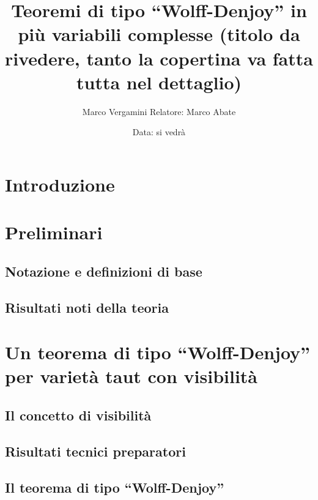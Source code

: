 \documentclass{article}
\title{Teoremi di tipo ``Wolff-Denjoy'' in più variabili complesse (titolo da rivedere, tanto la copertina va fatta tutta nel dettaglio)}
\author{Marco Vergamini Relatore: Marco Abate}
\date{Data: si vedrà}
\begin{document}
\maketitle
\newpage
\tableofcontents
\newpage


\section*{Introduzione}


\newpage

\section{Preliminari}
\subsection{Notazione e definizioni di base}

\subsection{Risultati noti della teoria}


\newpage

\section{Un teorema di tipo ``Wolff-Denjoy'' per varietà taut con visibilità}
\subsection{Il concetto di visibilità}

\subsection{Risultati tecnici preparatori}

\subsection{Il teorema di tipo ``Wolff-Denjoy''}


\newpage

%
%
%
\end{document}
